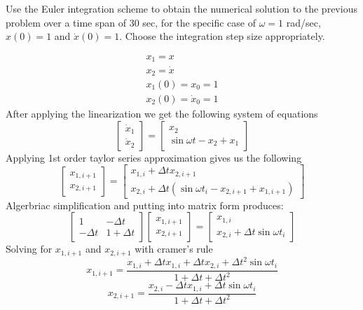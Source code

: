\documentclass[12pt]{exam}
\begin{document}
\begin{questions}
\newpage 
\begin{question}
Use the Euler integration scheme to obtain the numerical solution to the previous
problem over a time span of 30 sec, for the specific case of \(\omega= 1\) rad/sec, \(x(0)=1\) and \(\dot{x}(0)=1\). Choose the integration step size appropriately.
\end{question}
\begin{solutionorbox}[\stretch{1}]
\[
\begin{matrix}
x_1 = x\\
x_2 = \dot{x} \\
x_1(0) = x_0 = 1\\
x_2(0) = \dot{x}_0 = 1
\end{matrix}
\]
After applying the linearization we get the following system of equations
\[\begin{bmatrix}
\dot{x}_1 \\ \dot{x}_2  
\end{bmatrix}
=
\begin{bmatrix}
x_2 \\ \sin{\omega t} - x_2 + x_1  
\end{bmatrix}
\]
Applying 1st order taylor series approximation gives us the following
\[\begin{bmatrix}
x_{1,i+1} \\ x_{2,i+1}
\end{bmatrix} = \begin{bmatrix}
x_{1,i} + \Delta t x_{2,i+1} \\ x_{2,i} + \Delta t(\sin{\omega t_i}-x_{2,i+1} + x_{1,i+1})
\end{bmatrix}\]
Algerbriac simplification and putting into matrix form produces:
\[\begin{bmatrix}
1 & -\Delta t \\ -\Delta t & 1+\Delta t
\end{bmatrix}
\begin{bmatrix}
x_{1,i+1} \\ x_{2,i+1}
\end{bmatrix}
=
\begin{bmatrix}
x_{1,i} \\ x_{2,i} + \Delta t \sin{\omega t_i}  
\end{bmatrix}
\]
Solving for \(x_{1,i+1}\) and \(x_{2,i+1}\) with cramer's rule
\[x_{1,i+1} = \frac{x_{1,i}+\Delta t x_{1,i} + \Delta t x_{2,i} + \Delta t^2 \sin{\omega t_i}}{1+\Delta t + \Delta t^2}\]
\[x_{2,i+1} = \frac{x_{2,i}-\Delta t x_{1,i} + \Delta t \sin{\omega t_i}}{1+\Delta t + \Delta t^2}\]
\end{solutionorbox}

\end{questions}
\end{document}
